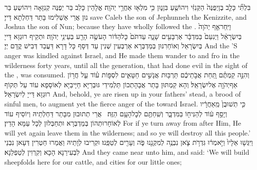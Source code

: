 {בִּלְתִּ֞י כָּלֵ֤ב בֶּן\maqqaf יְפֻנֶּה֙ הַקְּנִזִּ֔י וִיהוֹשֻׁ֖עַ בִּן\maqqaf נ֑וּן כִּ֥י מִלְא֖וּ אַחֲרֵ֥י יְהֹוָֽה׃}
{אֱלָהֵין כָּלֵב בַּר יְפֻנֶּה קְנִזָּאָה וִיהוֹשֻעַ בַּר נוּן אֲרֵי אַשְׁלִימוּ בָּתַר דַּחְלְתָא דַּייָ׃}
{save Caleb the son of Jephunneh the Kenizzite, and Joshua the son of Nun; because they have wholly followed the \lord.}{}
{וַיִּֽחַר\maqqaf אַ֤ף יְהֹוָה֙ בְּיִשְׂרָאֵ֔ל וַיְנִעֵם֙ בַּמִּדְבָּ֔ר אַרְבָּעִ֖ים שָׁנָ֑ה עַד\maqqaf תֹּם֙ כׇּל\maqqaf הַדּ֔וֹר הָעֹשֶׂ֥ה הָרַ֖ע בְּעֵינֵ֥י יְהֹוָֽה׃}
{וּתְקֵיף רוּגְזָא דַּייָ בְּיִשְׂרָאֵל וְאוֹחַרִנּוּן בְּמַדְבְּרָא אַרְבְּעִין שְׁנִין עַד דְּסָף כָּל דָּרָא דַּעֲבַד דְּבִישׁ קֳדָם יְיָ׃}
{And the \lord’S anger was kindled against Israel, and He made them wander to and fro in the wilderness forty years, until all the generation, that had done evil in the sight of the \lord, was consumed.}{}
{וְהִנֵּ֣ה קַמְתֶּ֗ם תַּ֚חַת אֲבֹ֣תֵיכֶ֔ם תַּרְבּ֖וּת אֲנָשִׁ֣ים חַטָּאִ֑ים לִסְפּ֣וֹת ע֗וֹד עַ֛ל חֲר֥וֹן אַף\maqqaf יְהֹוָ֖ה אֶל\maqqaf יִשְׂרָאֵֽל׃}
{וְהָא קַמְתּוּן בָּתַר אֲבָהָתְכוֹן תַּלְמִידֵי גּוּבְרַיָּא חַיָּיבַיָּא לְאוֹסָפָא עוֹד עַל תְּקוֹף רוּגְזָא דַּייָ לְיִשְׂרָאֵל׃}
{And, behold, ye are risen up in your fathers’ stead, a brood of sinful men, to augment yet the fierce anger of the \lord\space toward Israel.}{}
{כִּ֤י תְשׁוּבֻן֙ מֵֽאַחֲרָ֔יו וְיָסַ֣ף ע֔וֹד לְהַנִּיח֖וֹ בַּמִּדְבָּ֑ר וְשִֽׁחַתֶּ֖ם לְכׇל\maqqaf הָעָ֥ם הַזֶּֽה׃ \setuma }
{אֲרֵי תְתוּבוּן מִבָּתַר דַּחְלְתֵיהּ וְיוֹסֵיף עוֹד לְאוֹחָרוּתְהוֹן בְּמַדְבְּרָא וּתְחַבְּלוּן לְכָל עַמָּא הָדֵין׃}
{For if ye turn away from after Him, He will yet again leave them in the wilderness; and so ye will destroy all this people.’}{}
{וַיִּגְּשׁ֤וּ אֵלָיו֙ וַיֹּ֣אמְר֔וּ גִּדְרֹ֥ת צֹ֛אן נִבְנֶ֥ה לְמִקְנֵ֖נוּ פֹּ֑ה וְעָרִ֖ים לְטַפֵּֽנוּ׃}
{וּקְרִיבוּ לְוָתֵיהּ וַאֲמַרוּ חַטְרִין דְּעָאן נִבְנֵי לִבְעִירַנָא הָכָא וְקִרְוִין לְטַפְלַנָא׃}
{And they came near unto him, and said: ‘We will build sheepfolds here for our cattle, and cities for our little ones;}{}

